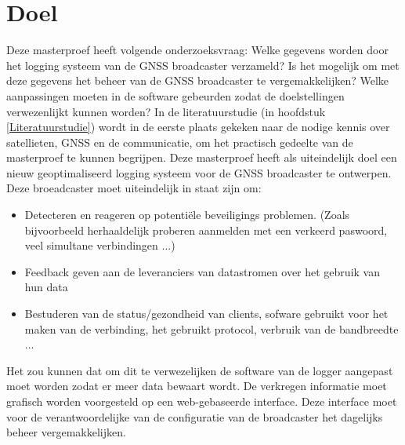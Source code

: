 \section{Doel}
\label{SDoe}
Deze masterproef heeft volgende onderzoeksvraag: \newline
\MyIndentSit Welke gegevens worden door het logging systeem van de GNSS broadcaster verzameld? \newline
\MyIndentSit Is het mogelijk om met deze gegevens het beheer van de GNSS broadcaster te vergemakkelijken?\newline
\MyIndentSit Welke aanpassingen moeten in de software gebeurden zodat de doelstellingen verwezenlijkt kunnen worden? 
In de literatuurstudie (in hoofdstuk \ref{Literatuurstudie}) wordt in de eerste plaats gekeken naar de nodige kennis over satellieten, GNSS en de communicatie, om het practisch gedeelte van de masterproef te kunnen begrijpen.
\newline
Deze masterproef heeft als uiteindelijk doel een nieuw geoptimaliseerd logging systeem voor de GNSS broadcaster te ontwerpen. Deze broeadcaster moet uiteindelijk in staat zijn om:
\begin{itemize}
	\item Detecteren en reageren op potenti\"ele beveiligings problemen. (Zoals bijvoorbeeld herhaaldelijk proberen aanmelden met een verkeerd paswoord, veel simultane verbindingen ...)
	\item Feedback geven aan de leveranciers van datastromen over het gebruik van hun data
	\item Bestuderen van de status/gezondheid van clients, sofware gebruikt voor het maken van de verbinding, het gebruikt protocol, verbruik van de bandbreedte ...
\end{itemize}
Het zou kunnen dat om dit te verwezelijken de software van de logger aangepast moet worden zodat er meer data bewaart wordt. De verkregen informatie moet grafisch worden voorgesteld op een web-gebaseerde interface.  Deze interface moet voor de verantwoordelijke van de configuratie van de broadcaster het dagelijks beheer vergemakkelijken. 